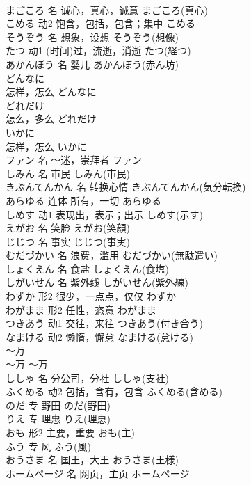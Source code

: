 \documentclass[8pt]{extreport}
\begin{document}
\begin{CJK}{UTF8}{min}
\\	まごころ	名	诚心，真心，诚意	まごころ(真心)	
\\	こめる	动2	饱含，包括，包含；集中	こめる	
\\	そうぞう	名	想象，设想	そうぞう(想像)	
\\	たつ	动1	(时间)过，流逝，消逝	たつ(経つ)	
\\	あかんぼう	名	婴儿	あかんぼう(赤ん坊)	
\\	どんなに	
\\	怎样，怎么	どんなに	
\\	どれだけ	
\\	怎么，多么	どれだけ	
\\	いかに	
\\	怎样，怎么	いかに	
\\	ファン	名	～迷，崇拜者	ファン	
\\	しみん	名	市民	しみん(市民)	
\\	きぶんてんかん	名	转换心情	きぶんてんかん(気分転換)	
\\	あらゆる	连体	所有，一切	あらゆる	
\\	しめす	动1	表现出，表示；出示	しめす(示す)	
\\	えがお	名	笑脸	えがお(笑顔)	
\\	じじつ	名	事实	じじつ(事実)	
\\	むだづかい	名	浪费，滥用	むだづかい(無駄遣い)	
\\	しょくえん	名	食盐	しょくえん(食塩)	
\\	しがいせん	名	紫外线	しがいせん(紫外線)	
\\	わずか	形2	很少，一点点，仅仅	わずか	
\\	わがまま	形2	任性，恣意	わがまま	
\\	つきあう	动1	交往，来往	つきあう(付き合う)	
\\	なまける	动2	懒惰，懈怠	なまける(怠ける)	
\\	～万	
\\	～万	～万	
\\	ししゃ	名	分公司，分社	ししゃ(支社)	
\\	ふくめる	动2	包括，含有，包含	ふくめる(含める)	
\\	のだ	专	野田	のだ(野田)	
\\	りえ	专	理惠	りえ(理恵)	
\\	おも	形2	主要，重要	おも(主)	
\\	ふう	专	风	ふう(風)	
\\	おうさま	名	国王，大王	おうさま(王様)	
\\	ホームページ	名	网页，主页	ホームページ	

\end{CJK}
\end{document}
